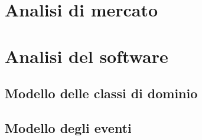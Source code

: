 
\section{Analisi di mercato}

\section{Analisi del software}

    \subsection{Modello delle classi di dominio}

    \subsection{Modello degli eventi}


